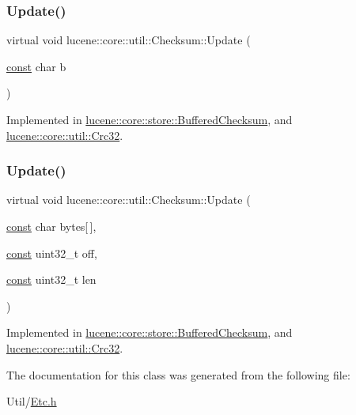 \subsubsection{\texorpdfstring{Update()}{Update()}\hspace{0.1cm}{\footnotesize\ttfamily [1/2]}}
{\footnotesize\ttfamily virtual void lucene\+::core\+::util\+::\+Checksum\+::\+Update (\begin{DoxyParamCaption}\item[{\mbox{\hyperlink{ZlibCrc32_8h_a2c212835823e3c54a8ab6d95c652660e}{const}} char}]{b }\end{DoxyParamCaption})\hspace{0.3cm}{\ttfamily [pure virtual]}}



Implemented in \mbox{\hyperlink{classlucene_1_1core_1_1store_1_1BufferedChecksum_a3dae873ad624ab688910f1582a94f5a4}{lucene\+::core\+::store\+::\+Buffered\+Checksum}}, and \mbox{\hyperlink{classlucene_1_1core_1_1util_1_1Crc32_a2d602ecc736c5cc5a0281bccc032b4fc}{lucene\+::core\+::util\+::\+Crc32}}.

\mbox{\label{classlucene_1_1core_1_1util_1_1Checksum_aab3bdd13efe91e6e582b56fd64a304b6}} 
\subsubsection{\texorpdfstring{Update()}{Update()}\hspace{0.1cm}{\footnotesize\ttfamily [2/2]}}
{\footnotesize\ttfamily virtual void lucene\+::core\+::util\+::\+Checksum\+::\+Update (\begin{DoxyParamCaption}\item[{\mbox{\hyperlink{ZlibCrc32_8h_a2c212835823e3c54a8ab6d95c652660e}{const}} char}]{bytes\mbox{[}$\,$\mbox{]},  }\item[{\mbox{\hyperlink{ZlibCrc32_8h_a2c212835823e3c54a8ab6d95c652660e}{const}} uint32\+\_\+t}]{off,  }\item[{\mbox{\hyperlink{ZlibCrc32_8h_a2c212835823e3c54a8ab6d95c652660e}{const}} uint32\+\_\+t}]{len }\end{DoxyParamCaption})\hspace{0.3cm}{\ttfamily [pure virtual]}}



Implemented in \mbox{\hyperlink{classlucene_1_1core_1_1store_1_1BufferedChecksum_aca5120e922ed6723c768d899c91522f4}{lucene\+::core\+::store\+::\+Buffered\+Checksum}}, and \mbox{\hyperlink{classlucene_1_1core_1_1util_1_1Crc32_aadb0ec93d3d2097302c869a1f4f61602}{lucene\+::core\+::util\+::\+Crc32}}.



The documentation for this class was generated from the following file\+:\begin{DoxyCompactItemize}
\item 
Util/\mbox{\hyperlink{Etc_8h}{Etc.\+h}}\end{DoxyCompactItemize}
